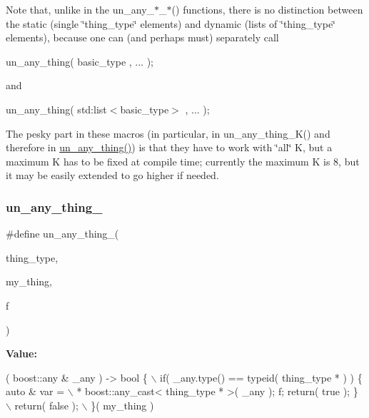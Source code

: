 Note that, unlike in the un\+\_\+any\+\_\+$\ast$\+\_\+$\ast$() functions, there is no distinction between the static (single \char`\"{}thing\+\_\+type\char`\"{} elements) and dynamic (lists of \char`\"{}thing\+\_\+type\char`\"{} elements), because one can (and perhaps must) separately call

un\+\_\+any\+\_\+thing( basic\+\_\+type , ... );

and

un\+\_\+any\+\_\+thing( std\+:list$<$basic\+\_\+type$>$ , ... );

The pesky part in these macros (in particular, in un\+\_\+any\+\_\+thing\+\_\+\+K() and therefore in \mbox{\hyperlink{group__boost__any__stuff_gab299af634bc1ca9be3a8d45a14560036}{un\+\_\+any\+\_\+thing()}}) is that they have to work with \char`\"{}all\char`\"{} K, but a maximum K has to be fixed at compile time; currently the maximum K is 8, but it may be easily extended to go higher if needed. \mbox{\label{group__boost__any__stuff_gaa78a761d28a8636cdd5e88133a6279cd}} 
\subsubsection{\texorpdfstring{un\+\_\+any\+\_\+thing\+\_}{un\_any\_thing\_0}}
{\footnotesize\ttfamily \#define un\+\_\+any\+\_\+thing\+\_(\begin{DoxyParamCaption}\item[{}]{thing\+\_\+type,  }\item[{}]{my\+\_\+thing,  }\item[{}]{f }\end{DoxyParamCaption})}

{\bfseries Value\+:}
\begin{DoxyCode}
[&]( boost::any & \_any ) -> \textcolor{keywordtype}{bool} \{ \(\backslash\)
  if( \_any.type() == \textcolor{keyword}{typeid}( thing\_type * ) ) \{ \textcolor{keyword}{auto} & var = \(\backslash\)
   * boost::any\_cast< thing\_type * >( \_any ); f; \textcolor{keywordflow}{return}( \textcolor{keyword}{true} ); \} \(\backslash\)
  return( \textcolor{keyword}{false} ); \(\backslash\)
  \}( my\_thing )
\end{DoxyCode}
\mbox{\label{group__boost__any__stuff_ga516114bf85ad495740369e69d04cc8c3}} 
